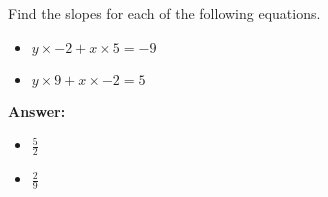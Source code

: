  Find the slopes for each of the following equations. \begin{itemize}\item \( y \times -2 + x \times 5 = -9 \)\item \( y \times 9 + x \times -2 = 5 \)\end{itemize}

        \textbf{Answer:} \begin{itemize}\item \( \frac{5}{2} \)\item \( \frac{2}{9} \)\end{itemize}
